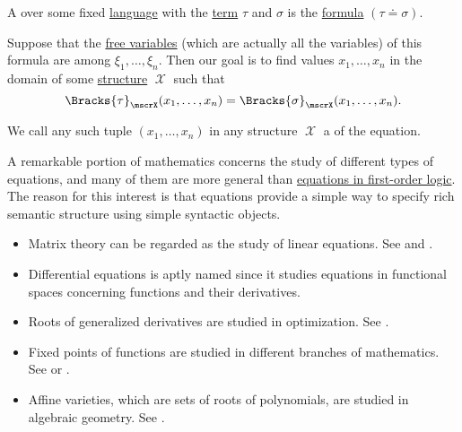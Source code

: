 \begin{definition}\label{def:first_order_equation}\mimprovised
  A  over some fixed \hyperref[def:first_order_language]{language} with  the \hyperref[def:first_order_syntax/term]{term} \( \tau \) and  \( \sigma \) is the \hyperref[def:first_order_syntax/formula]{formula} \( (\tau \doteq \sigma) \).

  Suppose that the \hyperref[def:first_order_syntax/formula_free_variables]{free variables} (which are actually all the variables) of this formula are among \( \xi_1, \ldots, \xi_n \). Then our goal is to find values \( x_1, \ldots, x_n \) in the domain of some \hyperref[def:first_order_structure]{structure} \( \mscrX \) such that
  \begin{equation*}
    \Bracks{\tau}_\mscrX(x_1, \ldots, x_n) = \Bracks{\sigma}_\mscrX(x_1, \ldots, x_n).
  \end{equation*}

  We call any such tuple \( (x_1, \ldots, x_n) \) in any structure \( \mscrX \) a  of the equation.
\end{definition}

\begin{example}\label{ex:equations}
  A remarkable portion of mathematics concerns the study of different types of equations, and many of them are more general than \hyperref[def:first_order_equation]{equations in first-order logic}. The reason for this interest is that equations provide a simple way to specify rich semantic structure using simple syntactic objects.

  \begin{itemize}
    \item Matrix theory can be regarded as the study of linear equations. See  and .
    \item Differential equations is aptly named since it studies equations in functional spaces concerning functions and their derivatives.
    \item Roots of generalized derivatives are studied in optimization. See .
    \item Fixed points of functions are studied in different branches of mathematics. See  or .
    \item Affine varieties, which are sets of roots of polynomials, are studied in algebraic geometry. See .
  \end{itemize}
\end{example}

